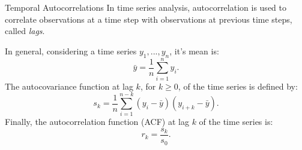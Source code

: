\begin{comment}
\begin{frame}
\begin{figure}[!ht]
\begin{subfigure}{.5\textwidth}
  \centering
  \texttt{[image: M2\_V22\_Vrancea\_20km\_1<mag<10]}
  \caption{With M2(0)}
  \label{fig:corr20km}
\end{subfigure}%
\begin{subfigure}{.5\textwidth}
  \centering
  \texttt{[image: M2\_V22\_Vrancea\_20km\_1<mag<10\_without0]}
  \caption{Without M2(0)}
  \label{fig:corr20km_noZero}
\end{subfigure}
\caption{Spatial autocorrelation function $M2(r)$ for Vrancea seismic zone split into $20\times20\times20$ km cubes. $r$ represents the distance in multiples of $20$ km. The right hand plot, without the point $M2(0)$ better displays the feature of the plot}
\label{fig:spcorrVrancea20km}
\end{figure}
\end{frame}

\end{comment}

\begin{frame}
{Temporal Autocorrelations}
In time series analysis, autocorrelation is used to correlate observations at a time step with observations at previous time steps, called {\it lags}.\par 
In general, considering a time series $y_1,...,y_n$, it's mean is:
\begin{equation}
\bar{y}=\frac{1}{n}\sum_{i=1}^n y_i.
\end{equation}
The autocovariance function at lag $k$, for $k \geq 0$, of the time series is defined by:
\begin{equation}
s_k = \frac{1}{n}\sum_{i=1}^{n-k}(y_i - \bar{y})(y_{i+k} - \bar{y}).
\end{equation}
Finally, the autocorrelation function (ACF) at lag $k$ of the time series is:
\begin{equation}
r_k = \frac{s_k}{s_0}.
\end{equation}
\end{frame}


